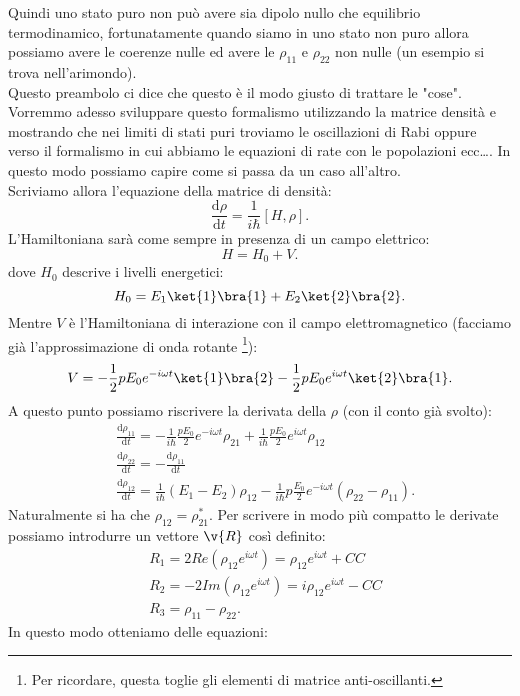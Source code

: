 Quindi uno stato puro non può avere sia dipolo nullo che equilibrio termodinamico, fortunatamente quando siamo in uno stato non puro allora possiamo avere le coerenze nulle ed avere le $\rho_{11}$ e $\rho_{22}$  non nulle (un esempio si trova nell'arimondo).\\
Questo preambolo ci dice che questo è il modo giusto di trattare le "cose". Vorremmo adesso sviluppare questo formalismo utilizzando la matrice densità e mostrando che nei limiti di stati puri troviamo le oscillazioni di Rabi oppure verso il formalismo in cui abbiamo le equazioni di rate con le popolazioni ecc\ldots. In questo modo possiamo capire come si passa da un caso all'altro.\\
Scriviamo allora l'equazione della matrice di densità:
\[
\frac{\text{d} \rho}{\text{d} t} = \frac{1}{i \hbar}\left[H,\rho\right]
.\] 
L'Hamiltoniana sarà come sempre in presenza di un campo elettrico:
\[
H= H_0+V
.\]
dove $H_0$ descrive i livelli energetici:
\[
H_0=E_1\ket{1}\bra{1}+E_2\ket{2}\bra{2}
.\] 
Mentre $V$ è l'Hamiltoniana di interazione con il campo elettromagnetico (facciamo già l'approssimazione di onda rotante
\footnote{Per ricordare, questa toglie gli elementi di matrice anti-oscillanti.}):
\[
V=-\frac{1}{2}pE_0e^{-i\omega t}\ket{1}\bra{2}-\frac{1}{2}pE_0e^{i\omega t}\ket{2}\bra{1}
.\] 
A questo punto possiamo riscrivere la derivata della $\rho$ (con il conto già svolto):
\[\begin{aligned}
    &\frac{\text{d} \rho_{11}}{\text{d} t} =
	-\frac{1}{i\hbar }\frac{pE_0}{2}e^{-i\omega t}\rho_{21}
	+\frac{1}{i\hbar }\frac{pE_0}{2}e^{i\omega t}\rho_{12} \\
    &\frac{\text{d} \rho_{22}}{\text{d} t} = 
    -\frac{\text{d} \rho_{11}}{\text{d} t} \\
    &\frac{\text{d} \rho_{12}}{\text{d} t} =
    \frac{1}{i\hbar }\left(E_1-E_2\right)\rho_{12}
    -\frac{1}{i\hbar}p\frac{E_0}{2}e^{-i\omega t}
    \left(\rho_{22}-\rho_{11}\right)
.\end{aligned}\]
Naturalmente si ha che $\rho_{12}=\rho_{21}^*$. Per scrivere in modo più compatto le derivate possiamo introdurre un vettore $\v{R}$ così definito:
\[\begin{aligned}
    &R_1=2Re\left(\rho_{12}e^{i\omega t}\right)=\rho_{12}e^{i\omega t}+ CC\\
    &R_2= -2 Im\left(\rho_{12}e^{i\omega t}\right)=i\rho_{12}e^{i\omega t}- CC\\
    &R_3 = \rho_{11}-\rho_{22}
.\end{aligned}\]
In questo modo otteniamo delle equazioni:
